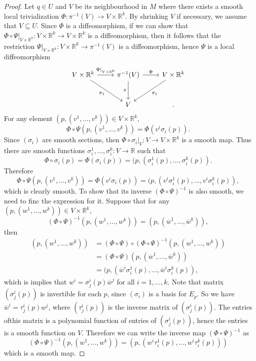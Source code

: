 \documentclass[a4paper]{article}
\theoremstyle{remark}
\newcommand{\er}{\mathbb{R}} %
\newcommand{\rk}{\mathbb{R}^k} %
\newcommand{\subhim}{\subseteq} %
\begin{document}
\begin{proof}
Let $q \in U$ and $V$ be its neighbourhood in $M$ where there exists a smooth local trivialization $\Phi : \pi^{-1}(V) \to V \times \rk$. By shrinking $V$ if necessary, we assume that $V \subhim U$. Since $\Phi$ is a diffeomorphism, if we can show that $\Phi \circ \Psi|_{V \times \rk} : V \times \rk \to V \times \rk$ is a diffeomorphism, then it follows that the restriction $\Psi|_{V \times \rk} : V \times \rk  \to \pi^{-1}(V)$ is a diffeomorphism, hence $\Psi$ is a local diffeomorphism
\[
\begin{tikzcd}[row sep=large]
V \times \rk \arrow[r,"\Psi|_{V \times \rk}"] \arrow[dr,"\pi_1",swap] & \pi^{-1}(V) \arrow[d,"\pi",swap] \arrow[r,"\Phi"] & V \times \rk \arrow[dl,"\pi_1"] \\
&V&.
\end{tikzcd}
\]
For any element $(p,(v^1,\dots,v^k)) \in V \times \rk$,
$$
\Phi \circ \Psi(p,(v^1,\dots,v^k)) = \Phi (v^i\sigma_i(p)).
$$
Since $(\sigma_i)$ are smooth sections, then $\Phi \circ \sigma_i|_V : V \to V \times \rk$ is a smooth map. Thus there are smooth functions $\sigma_i^1,\dots,\sigma_i^k : V \to \er$ such that 
$$
\Phi \circ \sigma_i(p) = \Phi(\sigma_i(p)) = (p,(\sigma_i^1(p),\dots,\sigma_i^k(p)).
$$
Therefore
$$
\Phi \circ \Psi (p,(v^1,\dots,v^k)) = \Phi (v^i\sigma_i(p)) = (p,(v^i\sigma_i^1(p),\dots,v^i\sigma_i^k(p)),
$$
which is clearly smooth. To show that its inverse $(\Phi \circ \Psi)^{-1}$ is also smooth, we need to finc the expression for it. Suppose that for any $(p,(w^1,\dots,w^k)) \in V \times \rk$,
$$
(\Phi \circ \Psi)^{-1}(p,(w^1,\dots,w^k)) = (p,(\overline{w}^1,\dots,\overline{w}^k)),
$$
then
\begin{align*}
(p,(w^1,\dots,w^k)) &= (\Phi \circ \Psi) \circ (\Phi \circ \Psi)^{-1}(p,(w^1,\dots,w^k)) \\
&=(\Phi \circ \Psi) (p,(\overline{w}^1,\dots,\overline{w}^k))\\
&= (p,(\overline{w}^i \sigma_i^1(p),\dots,\overline{w}^i\sigma_i^k(p)),
\end{align*}
which is implies that $w^i = \sigma^i_j(p) \overline{w}^j$ for all $i=1,\dots,k$. Note that matrix $(\sigma^i_j(p))$ is invertible for each $p$, since $(\sigma_i)$ is a basis for $E_p$. So we have $\overline{w}^i = \tau^i_j(p) w^j$, where $(\tau^i_j(p))$ is the inverse matrix of $(\sigma^i_j(p))$. The entries ofthis matrix is a polynomial function of entries of $(\sigma_j^i(p))$, hence the entries is a smooth function on $V$. Therefore we can write the inverse map $(\Phi \circ \Psi)^{-1}$ as
$$
(\Phi \circ \Psi)^{-1}(p,(w^1,\dots,w^k)) = (p,(w^i\tau_i^1(p),\dots,w^i\tau_i^k(p)))
$$
which is a smooth map.
\end{proof}
\end{document}
